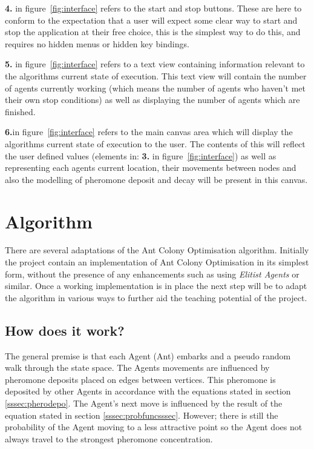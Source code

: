 \documentclass[10pt,a4paper]{article}
\begin{document}
\textbf{4.} in figure~\ref{fig:interface} refers to the start and stop buttons. These are here to conform to the expectation that a user will expect some clear way to start and stop the application at their free choice, this is the simplest way to do this, and requires no hidden menus or hidden key bindings.

\textbf{5.} in figure~\ref{fig:interface} refers to a text view containing information relevant to the algorithms current state of execution. This text view will contain the number of agents currently working (which means the number of agents who haven't met their own stop conditions) as well as displaying the number of agents which are finished.

\textbf{6.}in figure~\ref{fig:interface} refers to the main canvas area which will display the algorithms current state of execution to the user. The contents of this will reflect the user defined values (elements in: \textbf{3.} in figure~\ref{fig:interface}) as well as representing each agents current location, their movements between nodes and also the modelling of pheromone deposit and decay will be present in this canvas.


\section{Algorithm}

There are several adaptations of the Ant Colony Optimisation algorithm. Initially the project contain an implementation of Ant Colony Optimisation in its simplest form, without the presence of any enhancements such as using \textit{Elitist Agents} or similar. Once a working implementation is in place the next step will be to adapt the algorithm in various ways to further aid the teaching potential of the project.

\subsection{How does it work?}

The general premise is that each Agent (Ant) embarks and a pseudo random walk through the state space. The Agents movements are influenced by pheromone deposits placed on edges between vertices. This pheromone is deposited by other Agents in accordance with the equations stated in section \ref{sssec:pherodepo}. The Agent's next move is influenced by the result of the equation stated in section \ref{sssec:probfuncsssec}. However; there is still the probability of the Agent moving to a less attractive point so the Agent does not always travel to the strongest pheromone concentration.
\end{document}
